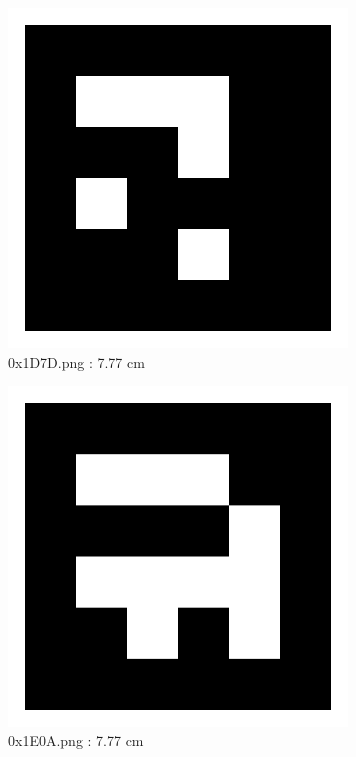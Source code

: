 \documentclass[11pt,a4,BCOR=0cm]{scrartcl}
\begin{document}
\begin{figure}
  \centering
    \includegraphics[natwidth=400,natheight=400,width=9cm]{0x1D7D.png}
    \caption{0x1D7D.png : 7.77 cm}
    \label{fig:0x1D7D.png}
  
\end{figure} 

\begin{figure}
  \centering
    \includegraphics[natwidth=400,natheight=400,width=9cm]{0x1E0A.png}
    \caption{0x1E0A.png : 7.77 cm}
    \label{fig:0x1E0A.png}
  
\end{figure} 

\clearpage
\end{document}
